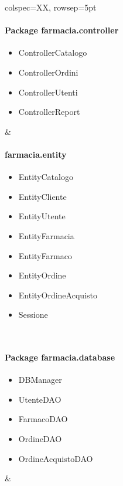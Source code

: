 \begin{table}[pt]
	\begin{tblr}{colspec=XX, rowsep=5pt}
		\begin{minipage}[t]{0.4\textwidth}
			\paragraph{Package farmacia.controller}
			\begin{itemize}[label=--]
				\item ControllerCatalogo
				\item ControllerOrdini
				\item ControllerUtenti
				\item ControllerReport
			\end{itemize}
		\end{minipage} &
		\begin{minipage}[t]{0.4\textwidth}
			\paragraph{farmacia.entity}
			\begin{itemize}[label=--]
				\item EntityCatalogo
				\item EntityCliente
				\item EntityUtente
				\item EntityFarmacia
				\item EntityFarmaco
				\item EntityOrdine
				\item EntityOrdineAcquisto
				\item Sessione
			\end{itemize}
		\end{minipage} \\
		\begin{minipage}[t]{0.4\textwidth}
			\paragraph{Package farmacia.database}
			\begin{itemize}[label=--]
				\item DBManager
				\item UtenteDAO
				\item FarmacoDAO
				\item OrdineDAO
				\item OrdineAcquistoDAO
			\end{itemize}
		\end{minipage} &
		\begin{minipage}[t]{0.4\textwidth}

\end{minipage}
\end{tblr}
\end{table}

